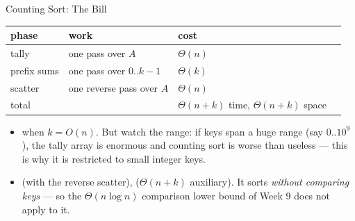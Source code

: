 \documentclass[aspectratio=169]{beamer}
\begin{document}
\begin{frame}{Counting Sort: The Bill}
  \begin{center}
  {\footnotesize
  \begin{tabular}{llll}
    \toprule
    \textbf{phase} & \textbf{work} & \textbf{cost} \\
    \midrule
    tally & one pass over $A$ & $\Theta(n)$ \\
    prefix sums & one pass over $0..k-1$ & $\Theta(k)$ \\
    scatter & one reverse pass over $A$ & $\Theta(n)$ \\
    \midrule
    total & & $\Theta(n + k)$ time, $\Theta(n + k)$ space \\
    \bottomrule
  \end{tabular}}
  \end{center}
  \begin{itemize}
    \item {} when $k = O(n)$. But watch the range: if keys
      span a huge range (say $0..10^9$), the tally array is enormous and
      counting sort is worse than useless --- this is why it is restricted to
      small integer keys.
    \item {} (with the reverse scatter), 
      ($\Theta(n + k)$ auxiliary). It sorts \emph{without comparing keys} ---
      so the $\Theta(n \log n)$ comparison lower bound of Week 9 does not
      apply to it.
  \end{itemize}
\end{frame}
\end{document}
